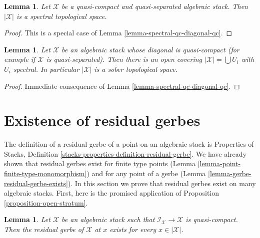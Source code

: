 \documentclass{stacks-project}
\theoremstyle{plain}
\newtheorem{lemma}[subsection]{Lemma}
\theoremstyle{definition}
\theoremstyle{remark}
\numberwithin{equation}{subsection}
\begin{document}
\begin{lemma}
\label{lemma-spectral-qcqs}
Let $\mathcal{X}$ be a quasi-compact and quasi-separated algebraic stack.
Then $|\mathcal{X}|$ is a spectral topological space.
\end{lemma}

\begin{proof}
This is a special case of Lemma \ref{lemma-spectral-qc-diagonal-qc}.
\end{proof}

\begin{lemma}
\label{lemma-sober-qs}
Let $\mathcal{X}$ be an algebraic stack whose diagonal is quasi-compact
(for example if $\mathcal{X}$ is quasi-separated).
Then there is an open covering $|\mathcal{X}| = \bigcup U_i$
with $U_i$ spectral. In particular $|\mathcal{X}|$ is
a sober topological space.
\end{lemma}

\begin{proof}
Immediate consequence of Lemma \ref{lemma-spectral-qc-diagonal-qc}.
\end{proof}






\section{Existence of residual gerbes}
\label{section-existence-residual-gerbes}

\noindent
The definition of a residual gerbe of a point on an algebraic stack
is Properties of Stacks, Definition
\ref{stacks-properties-definition-residual-gerbe}.
We have already shown that residual gerbes exist for finite type
points (Lemma \ref{lemma-point-finite-type-monomorphism})
and for any point of a gerbe (Lemma \ref{lemma-gerbe-residual-gerbe-exists}).
In this section we prove that residual gerbes
exist on many algebraic stacks. First, here is the promised
application of
Proposition \ref{proposition-open-stratum}.

\begin{lemma}
\label{lemma-every-point-residual-gerbe}
Let $\mathcal{X}$ be an algebraic stack such that
$\mathcal{I}_\mathcal{X} \to \mathcal{X}$ is quasi-compact.
Then the residual gerbe of $\mathcal{X}$ at $x$ exists for
every $x \in |\mathcal{X}|$.
\end{lemma}
\end{document}

